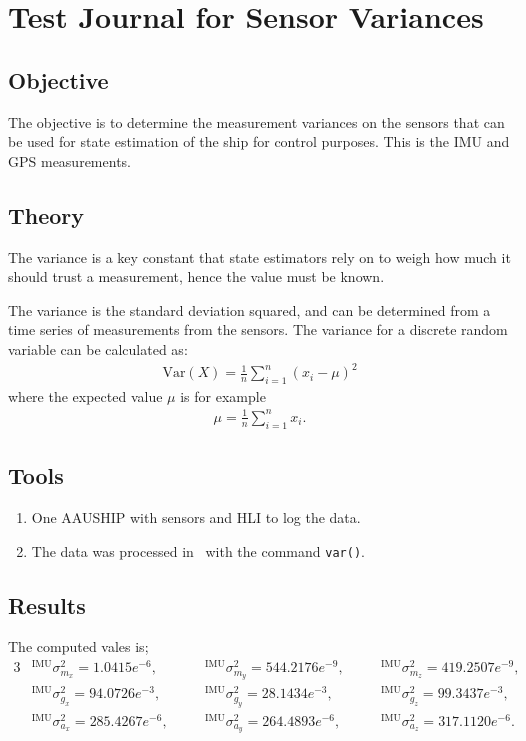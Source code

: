 \chapter{Test Journal for Sensor Variances}
\label{sc:variances}

\section{Objective}
The objective is to determine the measurement variances on the sensors
that can be used for state estimation of the ship for control
purposes. This is the \ac{IMU} and \ac{GPS} measurements.

\section{Theory}
The variance is a key constant that state estimators rely on to weigh
how much it should trust a measurement, hence the value must be known.

The variance is the standard deviation squared, and can be determined
from a time series of measurements from the sensors. The variance for
a discrete random variable can be calculated as:
\begin{align}
	\mathrm{Var}(X) = \frac{1}{n} \sum_{i=1}^n (x_i - \mu) ^2
\end{align}
where the expected value $\mu$ is for example
\begin{align}
	\mu = \frac{1}{n} \sum_{i=1}^n x_i.
\end{align}

\section{Tools}
\begin{enumerate}
	\item One AAUSHIP with sensors and \ac{HLI} to log the data.
	\item The data was processed in \MATLAB\ with the command
		\texttt{var()}.
\end{enumerate}

\section{Results}

The computed vales is;
\begin{alignat*}{3}
&^\text{IMU}\sigma_{m_x}^2 = 1.0415e^{-6},
\quad& &
^\text{IMU}\sigma_{m_y}^2 = 544.2176e^{-9},
\quad& &
^\text{IMU}\sigma_{m_z}^2 = 419.2507e^{-9},
\\ \nonumber
&^\text{IMU}\sigma_{g_x}^2 = 94.0726e^{-3},
\quad& &
^\text{IMU}\sigma_{g_y}^2 = 28.1434e^{-3},
\quad& &
^\text{IMU}\sigma_{g_z}^2 = 99.3437e^{-3},
\\ \nonumber
&^\text{IMU}\sigma_{a_x}^2 = 285.4267e^{-6},
\quad& &
^\text{IMU}\sigma_{a_y}^2 = 264.4893e^{-6},
\quad& &
^\text{IMU}\sigma_{a_z}^2 = 317.1120e^{-6}.
\end{alignat*}

